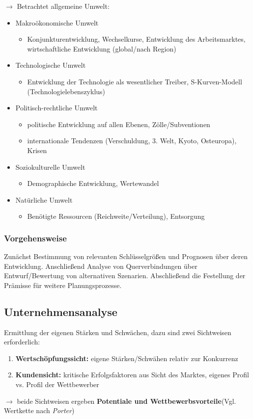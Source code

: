 \documentclass[a4paper,11pt, twoside]{article}
\newcommand\mpar[1]{\marginpar {\flushleft\small #1}}
\begin{document}
$\rightarrow$ Betrachtet allgemeine Umwelt:
\begin{itemize}
	\item Makroökonomische Umwelt
	\begin{itemize}
		\item Konjunkturentwicklung, Wechselkurse, Entwicklung des Arbeitsmarktes, wirtschaftliche Entwicklung (global/nach Region)
	\end{itemize}
	\item Technologische Umwelt
	\begin{itemize}
		\item Entwicklung der Technologie als wesentlicher Treiber, S-Kurven-Modell (Technologielebenszyklus)
	\end{itemize}
	\item Politisch-rechtliche Umwelt
	\begin{itemize}
		\item politische Entwicklung auf allen Ebenen, Zölle/Subventionen
		\item internationale Tendenzen (Verschuldung, 3. Welt, Kyoto, Osteuropa), Krisen
	\end{itemize}
	\item Soziokulturelle Umwelt
	\begin{itemize}
		\item Demographische Entwicklung, Wertewandel
	\end{itemize}
	\item Natürliche Umwelt
	\begin{itemize}
		\item Benötigte Ressourcen (Reichweite/Verteilung), Entsorgung
	\end{itemize}
\end{itemize}

\subsubsection*{Vorgehensweise}
Zunächst Bestimmung von relevanten Schlüsselgrößen und Prognosen über deren Entwicklung. Anschließend Analyse von Querverbindungen über Entwurf/Bewertung von alternativen Szenarien. Abschließend die Festellung der Prämisse für weitere Planungsprozesse.

\subsection{Unternehmensanalyse}

Ermittlung der eigenen Stärken und Schwächen, dazu sind zwei Sichtweisen erforderlich:
\begin{enumerate}
	\item \textbf{Wertschöpfungssicht:} eigene Stärken/Schwähen relativ zur Konkurrenz
	\item \textbf{Kundensicht:} kritische Erfolgsfaktoren aus Sicht des Marktes, eigenes Profil vs. Profil der Wettbewerber
\end{enumerate}
$\rightarrow$ beide Sichtweisen ergeben \textbf{Potentiale und Wettbewerbsvorteile}(Vgl. Wertkette nach \textit{Porter})
	\mpar{\textcolor{red}{Abschätzung der eigenen preislichen Lage auf dem Markt}}
\end{document}
